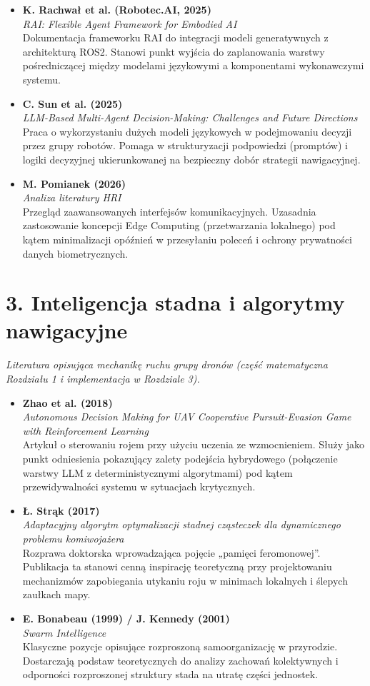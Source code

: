 \documentclass[12pt,a4paper]{article}
\newcommand{\lit}[3]{%
  \item
  \textbf{#1}\\[0.15em]
  \textit{#2}\\[0.35em]
  #3%
}
\begin{document}
\begin{itemize}[leftmargin=*, itemsep=1.1em]
    \lit{K. Rachwał et al. (Robotec.AI, 2025)}
        {RAI: Flexible Agent Framework for Embodied AI}
        {Dokumentacja frameworku RAI do integracji
        modeli generatywnych z architekturą ROS2.
        Stanowi punkt wyjścia do zaplanowania warstwy
        pośredniczącej między modelami językowymi
        a komponentami wykonawczymi systemu.}

    \lit{C. Sun et al. (2025)}
        {LLM-Based Multi-Agent Decision-Making:
        Challenges and Future Directions}
        {Praca o wykorzystaniu dużych modeli językowych
        w podejmowaniu decyzji przez grupy robotów.
        Pomaga w strukturyzacji podpowiedzi (promptów)
        i logiki decyzyjnej ukierunkowanej na bezpieczny
        dobór strategii nawigacyjnej.}

    \lit{M. Pomianek (2026)}
        {Analiza literatury HRI}
        {Przegląd zaawansowanych interfejsów
        komunikacyjnych. Uzasadnia zastosowanie koncepcji
        Edge Computing (przetwarzania lokalnego) pod
        kątem minimalizacji opóźnień w przesyłaniu
        poleceń i ochrony prywatności danych
        biometrycznych.}
\end{itemize}

\section*{3. Inteligencja stadna i algorytmy nawigacyjne}
\textit{Literatura opisująca mechanikę ruchu grupy
dronów (część matematyczna Rozdziału 1 i implementacja
w Rozdziale 3).}

\begin{itemize}[leftmargin=*, itemsep=1.1em]
    \lit{Zhao et al. (2018)}
        {Autonomous Decision Making for UAV Cooperative
        Pursuit-Evasion Game with Reinforcement Learning}
        {Artykuł o sterowaniu rojem przy użyciu uczenia
        ze wzmocnieniem. Służy jako punkt odniesienia
        pokazujący zalety podejścia hybrydowego
        (połączenie warstwy LLM z deterministycznymi
        algorytmami) pod kątem przewidywalności systemu
        w sytuacjach krytycznych.}

    \lit{Ł. Strąk (2017)}
        {Adaptacyjny algorytm optymalizacji stadnej
        cząsteczek dla dynamicznego problemu
        komiwojażera}
        {Rozprawa doktorska wprowadzająca pojęcie
        „pamięci feromonowej”. Publikacja ta stanowi
        cenną inspirację teoretyczną przy projektowaniu
        mechanizmów zapobiegania utykaniu roju
        w minimach lokalnych i ślepych zaułkach mapy.}

    \lit{E. Bonabeau (1999) / J. Kennedy (2001)}
        {Swarm Intelligence}
        {Klasyczne pozycje opisujące rozproszoną
        samoorganizację w przyrodzie.
        Dostarczają podstaw teoretycznych do analizy
        zachowań kolektywnych i odporności rozproszonej
        struktury stada na utratę części jednostek.}
\end{itemize}
\end{document}
